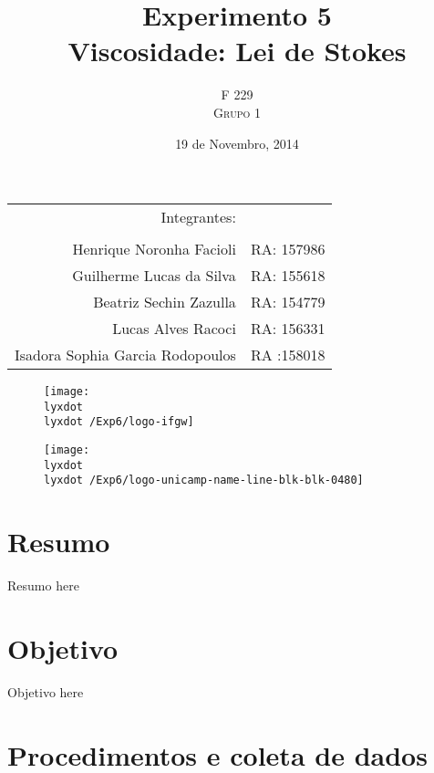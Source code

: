 \documentclass[english,brazil]{article}
\title{Experimento 5  \\ Viscosidade: Lei de Stokes } %
\author{F 229 \\ \textsc{Grupo 1}}
\date{19 de Novembro, 2014}
\providecommand{\tabularnewline}{\\}
\newcommand{\lyxdot}{.}
\begin{document}
	 \maketitle



	\begin{center}
		\begin{tabular}{rr}
			                    Integrantes:  & \tabularnewline
			                                  & \tabularnewline
			        Henrique Noronha Facioli  & RA: 157986 \tabularnewline
			        Guilherme Lucas da Silva  & RA: 155618 \tabularnewline
			          Beatriz Sechin Zazulla  & RA: 154779 \tabularnewline
			              Lucas Alves Racoci  & RA: 156331 \tabularnewline
			Isadora Sophia Garcia Rodopoulos  & RA :158018 \tabularnewline
		\end{tabular}
	\par\end{center}



	\begin{figure}[!ht]
		\begin{centering}
			\texttt{[image: \\lyxdot \\lyxdot /Exp6/logo-ifgw]} 
		\par\end{centering}
		\vspace*{1cm}
		\centering{}
		 	 \texttt{[image: \\lyxdot \\lyxdot /Exp6/logo-unicamp-name-line-blk-blk-0480]} 
	\end{figure}


	\newpage{}


	\section{Resumo}

		Resumo here


	\section{Objetivo}

		Objetivo here


	\section{Procedimentos e coleta de dados}
\end{document}
